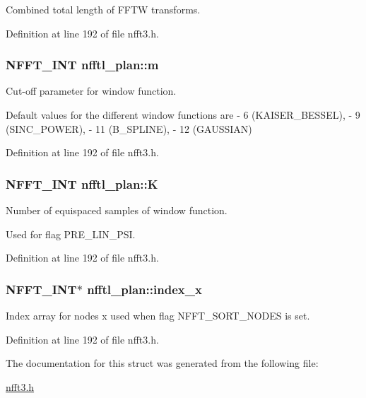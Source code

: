 Combined total length of F\-F\-T\-W transforms. 



Definition at line 192 of file nfft3.\-h.

\hypertarget{structnfftl__plan_aadaf25d2fd1158123136469a264a6a5b}{
\subsubsection[{m}]{\setlength{\rightskip}{0pt plus 5cm}N\-F\-F\-T\-\_\-\-I\-N\-T nfftl\-\_\-plan\-::m}}\label{structnfftl__plan_aadaf25d2fd1158123136469a264a6a5b}


Cut-\/off parameter for window function. 

Default values for the different window functions are -\/ 6 (K\-A\-I\-S\-E\-R\-\_\-\-B\-E\-S\-S\-E\-L), -\/ 9 (S\-I\-N\-C\-\_\-\-P\-O\-W\-E\-R), -\/ 11 (B\-\_\-\-S\-P\-L\-I\-N\-E), -\/ 12 (G\-A\-U\-S\-S\-I\-A\-N) 

Definition at line 192 of file nfft3.\-h.

\hypertarget{structnfftl__plan_acffbae62b14acf89ee913a5deace8bc9}{
\subsubsection[{K}]{\setlength{\rightskip}{0pt plus 5cm}N\-F\-F\-T\-\_\-\-I\-N\-T nfftl\-\_\-plan\-::\-K}}\label{structnfftl__plan_acffbae62b14acf89ee913a5deace8bc9}


Number of equispaced samples of window function. 

Used for flag P\-R\-E\-\_\-\-L\-I\-N\-\_\-\-P\-S\-I. 

Definition at line 192 of file nfft3.\-h.

\hypertarget{structnfftl__plan_a29a7a33a921435989294d8ea83111b90}{
\subsubsection[{index\-\_\-x}]{\setlength{\rightskip}{0pt plus 5cm}N\-F\-F\-T\-\_\-\-I\-N\-T$\ast$ nfftl\-\_\-plan\-::index\-\_\-x}}\label{structnfftl__plan_a29a7a33a921435989294d8ea83111b90}


Index array for nodes x used when flag N\-F\-F\-T\-\_\-\-S\-O\-R\-T\-\_\-\-N\-O\-D\-E\-S is set. 



Definition at line 192 of file nfft3.\-h.



The documentation for this struct was generated from the following file\-:\begin{DoxyCompactItemize}
\item 
\hyperlink{nfft3_8h}{nfft3.\-h}\end{DoxyCompactItemize}
